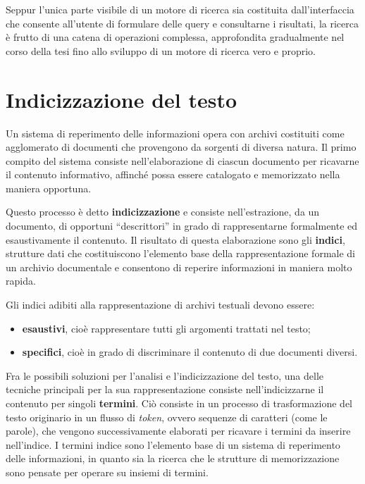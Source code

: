 \vspace{1em}

Seppur l’unica parte visibile di un motore di ricerca sia costituita dall’interfaccia che consente all’utente di formulare delle query e consultarne i risultati, la ricerca è frutto di una catena di operazioni complessa, approfondita gradualmente nel corso della tesi fino allo sviluppo di un motore di ricerca vero e proprio.
\pagebreak




\section{Indicizzazione del testo}

Un sistema di reperimento delle informazioni opera con archivi costituiti come agglomerato di documenti che provengono da sorgenti di diversa natura. Il primo compito del sistema consiste nell’elaborazione di ciascun documento per ricavarne il contenuto informativo, affinché possa essere catalogato e memorizzato nella maniera opportuna.

Questo processo è detto \textbf{indicizzazione} e consiste nell’estrazione, da un documento, di opportuni “descrittori” in grado di rappresentarne formalmente ed esaustivamente il contenuto. Il risultato di questa elaborazione sono gli \textbf{indici}, strutture dati che costituiscono l’elemento base della rappresentazione formale di un archivio documentale e consentono di reperire informazioni in maniera molto rapida.

\vspace{1em}
Gli indici adibiti alla rappresentazione di archivi testuali devono essere:
\begin{itemize}
\item \textbf{esaustivi}, cioè rappresentare tutti gli argomenti trattati nel testo;
\item \textbf{specifici}, cioè in grado di discriminare il contenuto di due documenti diversi.
\end{itemize}

Fra le possibili soluzioni per l’analisi e l’indicizzazione del testo, una delle tecniche principali per la sua rappresentazione consiste nell’indicizzarne il contenuto per singoli \textbf{termini}. Ciò consiste in un processo di trasformazione del testo originario in un flusso di \textit{token}, ovvero sequenze di caratteri (come le parole), che vengono successivamente elaborati per ricavare i termini da inserire nell’indice. I termini indice sono l’elemento base di un sistema di reperimento delle informazioni, in quanto sia la ricerca che le strutture di memorizzazione sono pensate per operare su insiemi di termini.

